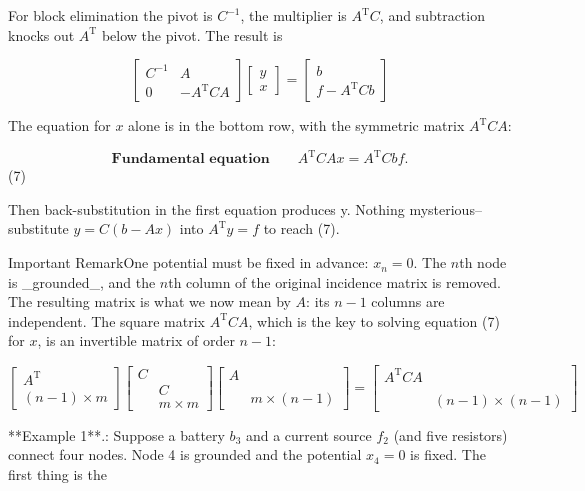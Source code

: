 For block elimination the pivot is \(C^{-1}\), the multiplier is \(A^{\mathrm{T}}C\), and subtraction knocks out \(A^{\mathrm{T}}\) below the pivot. The result is

\[\begin{bmatrix}C^{-1}&A\\ 0&-A^{\mathrm{T}}CA\end{bmatrix}\begin{bmatrix}y\\ x\end{bmatrix}=\begin{bmatrix}b\\ f-A^{\mathrm{T}}Cb\end{bmatrix}\]

The equation for \(x\) alone is in the bottom row, with the symmetric matrix \(A^{\mathrm{T}}CA\):

\[\textbf{Fundamental equation}\qquad A^{\mathrm{T}}CAx=A^{\mathrm{T}}Cbf.\] (7)

Then back-substitution in the first equation produces y. Nothing mysterious--substitute \(y=C(b-Ax)\) into \(A^{\mathrm{T}}y=f\) to reach (7).

Important RemarkOne potential must be fixed in advance: \(x_{n}=0\). The \(n\)th node is _grounded_, and the \(n\)th column of the original incidence matrix is removed. The resulting matrix is what we now mean by \(A\): its \(n-1\) columns are independent. The square matrix \(A^{\mathrm{T}}CA\), which is the key to solving equation (7) for \(x\), is an invertible matrix of order \(n-1\):

\[\begin{bmatrix}A^{\mathrm{T}}\\ (n-1)\times m\end{bmatrix}\begin{bmatrix}C\\ &C\\ &m\times m\end{bmatrix}\begin{bmatrix}A\\ &\\ &m\times(n-1)\end{bmatrix}=\begin{bmatrix}A^{\mathrm{T}}CA\\ &\\ &(n-1)\times(n-1)\end{bmatrix}\]

**Example 1**.: Suppose a battery \(b_{3}\) and a current source \(f_{2}\) (and five resistors) connect four nodes. Node 4 is grounded and the potential \(x_{4}=0\) is fixed. The first thing is the

